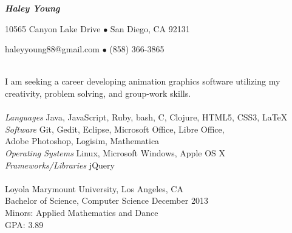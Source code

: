 \documentclass[11pt]{article}
\begin{document}
\centerline{{\Large \bf \emph{Haley Young}}}
\centerline{10565 Canyon Lake Drive $\bullet$ San Diego, CA 92131}
\centerline{haleyyoung88@gmail.com $\bullet$ (858) 366-3865}
\vspace{7 mm}

\vspace{3mm}\\
\indent I am seeking a career developing animation graphics software utilizing my creativity, problem solving, and
\indent group-work skills.\\

\vspace{1.5mm}\\
\indent \emph{Languages} \hfill Java, JavaScript, Ruby, bash, C, Clojure, HTML5, CSS3, LaTeX\\
\indent \emph{Software} \hfill  Git, Gedit, Eclipse, Microsoft Office, Libre Office,\\
\hfill Adobe Photoshop, Logisim, Mathematica\\
\indent \emph{Operating Systems} \hfill Linux, Microsoft Windows, Apple OS X\\
\indent \emph{Frameworks/Libraries} \hfill jQuery\\

\vspace{1.5mm}\\
\indent Loyola Marymount University, Los Angeles, CA\\
\indent Bachelor of Science, Computer Science \hfill December 2013\\
\indent Minors: Applied Mathematics and Dance\\
\indent GPA: 3.89\\
\end{document}
